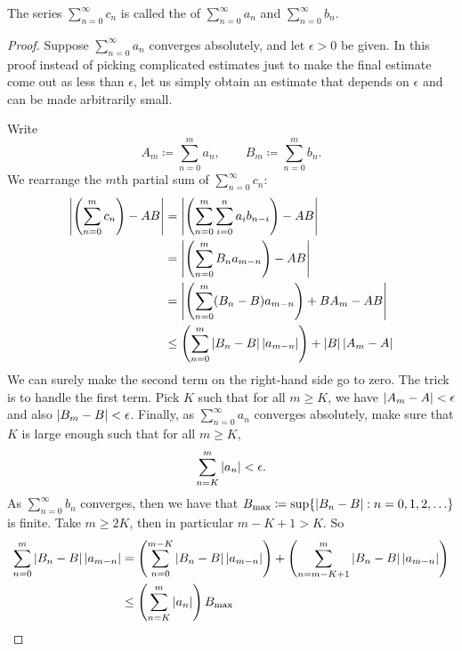 The series $\sum_{n=0}^\infty c_n$ is called the \emph{} of
$\sum_{n=0}^\infty a_n$ and $\sum_{n=0}^\infty b_n$.

\begin{proof}
Suppose $\sum_{n=0}^\infty a_n$ converges absolutely, and let $\epsilon > 0$ be
given.
In this proof instead of picking complicated estimates just to make
the final estimate come out as less than $\epsilon$,
let us simply obtain an estimate that depends on $\epsilon$
and can be made arbitrarily small.

Write
\begin{equation*}
A_m \coloneqq \sum_{n=0}^m a_n , \qquad B_m \coloneqq \sum_{n=0}^m b_n .
\end{equation*}
We rearrange the $m$th partial sum of $\sum_{n=0}^\infty c_n$:
\begin{equation*}
\begin{split}
\left\lvert {\left(\sum_{n=0}^m c_n \right) - AB} \right\rvert
& =
\left\lvert {\left( \sum_{n=0}^m \sum_{i=0}^n a_i b_{n-i} \right) - AB} \right\rvert
\\
& =
\left\lvert {\left( \sum_{n=0}^m
  B_n a_{m-n} \right) - AB} \right\rvert
\\
& =
\left\lvert {\left( \sum_{n=0}^m
  ( B_n -  B ) a_{m-n} \right)
    + B A_m - AB} \right\rvert
\\
& \leq
\left(
\sum_{n=0}^m
  \left\lvert { B_n -  B } \right\rvert \left\lvert {a_{m-n}} \right\rvert
\right)
+
\left\lvert {B} \right\rvert\left\lvert {A_m - A} \right\rvert
\end{split}
\end{equation*}
We can surely make the second term on the right-hand side go to zero.
The trick is to handle the first term.
Pick $K$ such that for all $m \geq K$, we have 
$\left\lvert {A_m - A} \right\rvert < \epsilon$ and
also
$\left\lvert {B_m - B} \right\rvert < \epsilon$.  Finally,
as $\sum_{n=0}^\infty a_n$ converges absolutely,
make sure that $K$ is large enough such that
for all $m \geq K$,
\begin{equation*}
\sum_{n=K}^m \left\lvert {a_n} \right\rvert < \epsilon .
\end{equation*}
As $\sum_{n=0}^\infty b_n$ converges, then
we have that
$B_{\text{max}} \coloneqq \sup \{ \left\lvert { B_n - B } \right\rvert : n = 0,1,2,\ldots \}$
is finite.  Take $m \geq 2K$, then in particular $m-K+1 > K$.  So
\begin{equation*}
\begin{split}
\sum_{n=0}^m
  \abs{ B_n -  B } \abs{a_{m-n}}
& =
\left(
\sum_{n=0}^{m-K}
  \abs{ B_n -  B } \abs{a_{m-n}}
\right)
+
\left(
\sum_{n=m-K+1}^m
  \abs{ B_n -  B } \abs{a_{m-n}}
\right)
\\
& \leq
\left(
\sum_{n=K}^m
\abs{a_{n}}
\right)
B_{\text{max}}

\end{split}
\end{equation*}
\end{proof}
